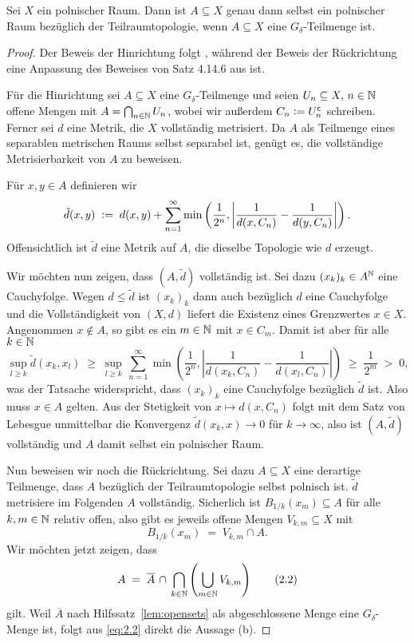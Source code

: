 \documentclass[../main/main.tex]{subfiles}
\begin{document}
	\begin{Satz}[Alexandroff]
		\label{thm:gdeltasubsetsofpolishspaces}
		Sei $X$ ein polnischer Raum. Dann ist $A \subseteq X$ genau dann selbst ein polnischer Raum bezüglich der Teilraumtopologie, 
		wenn $A \subseteq X$ eine $G_\delta$-Teilmenge ist.
	\end{Satz}
	
	\begin{proof}
		Der Beweis der Hinrichtung folgt \cite[Satz 7]{JordanBell.2014}, während der Beweis der Rückrichtung eine Anpassung des Beweises
		von Satz 4.14.6 aus \cite[Kapitel 4.14]{Simon.2015} ist.
		
		Für die Hinrichtung sei $A \subseteq X$ eine $G_\delta$-Teilmenge und seien 
		$U_n \subseteq X, \, n \in \mathbb{N}$ offene Mengen mit 
		$A = \bigcap_{n \in \mathbb{N}} U_n$, wobei wir außerdem 
		$C_n \vcentcolon = U_n^{\mathsf{c}}$ schreiben. Ferner sei 
		$d$ eine Metrik, die $X$ vollständig metrisiert. 
		Da $A$ als Teilmenge eines separablen metrischen Raums 
		selbst separabel ist, genügt es, die vollständige Metrisierbarkeit 
		von $A$ zu beweisen.
		
		Für $x, y \in A$ definieren wir
		\[\tilde{d}(x, y) \; \vcentcolon = \; d(x, y) + \sum_{n=1}^{\infty} \min \left(
		\frac{1}{2^n}, \left| \frac{1}{d(x, C_n)} - \frac{1}{d(y, C_n)} \right|
		\right) \text{.}\]
		Offensichtlich ist $\tilde{d}$ eine Metrik auf $A$, 
		die dieselbe Topologie wie $d$ erzeugt. 
		
		Wir möchten nun zeigen, dass $(A, \tilde{d})$ vollständig ist. 
		Sei dazu $(x_k)_k \in A^{\mathbb{N}}$ eine Cauchyfolge. Wegen $d \leq \tilde{d}$ 
		ist $(x_k)_k$ dann auch bezüglich $d$ eine Cauchyfolge und die 
		Vollständigkeit von $(X, d)$ liefert die Existenz eines Grenzwertes 
		$x \in X$. Angenommen $x \notin A$, so gibt es ein $m \in \mathbb{N}$ mit 
		$x \in C_m$. Damit ist aber für alle $k \in \mathbb{N}$
		$$\sup_{l \geq k} \tilde{d}(x_k, x_l) \; \geq \; \sup_{l \geq k} 
		\, \sum_{n=1}^{\infty} \min \left(
		\frac{1}{2^n}, \left| \frac{1}{d(x_k, C_n)} -
		\frac{1}{d(x_l, C_n)} \right|
		\right) \; \geq \; \frac{1}{2^m} \; > \; 0 \text{,}$$
		was der Tatsache widerspricht, dass $(x_k)_k$ eine Cauchyfolge 
		bezüglich $\tilde{d}$ ist. Also muss $x \in A$ gelten. 
		Aus der Stetigkeit von $x \mapsto d(x, C_n)$ folgt mit dem 
		Satz von Lebesgue unmittelbar die Konvergenz 
		$\tilde{d}(x_k, x) \to 0$ für $k \to \infty$,
		also ist $(A, \tilde{d})$ vollständig und $A$ damit selbst ein
		polnischer Raum.
		
		Nun beweisen wir noch die Rückrichtung. Sei dazu $A \subseteq X$ eine derartige Teilmenge, dass
		$A$ bezüglich der Teilraumtopologie selbst polnisch ist. $\tilde{d}$ metrisiere im Folgenden 
		$A$ vollständig.
		Sicherlich ist $B_{1/k}(x_m) \subseteq A$ für alle 
		$k, m \in \mathbb{N}$ relativ offen, also gibt es jeweils offene Mengen 
		$V_{k, m} \subseteq X$ mit
		\[ B_{1/k}(x_m) \; = \; V_{k, m} 
		\cap A \text{.} \label{eq:2.1} \tag{2.1}\]
		Wir möchten jetzt zeigen, dass
		\[ A \; = \; \overline{A} \, \cap \, 
		\bigcap_{k \in \mathbb{N}} \left( \bigcup_{m \in \mathbb{N}} V_{k, m} \right) 
		\label{eq:2.2} \tag{2.2}\]
		gilt. 
		Weil $\overline{A}$ nach Hilfssatz~\ref{lem:opensets} 
		als abgeschlossene Menge eine $G_\delta$-Menge ist, 
		folgt aus \eqref{eq:2.2} direkt die Aussage (b).
		

\end{proof}
\end{document}
